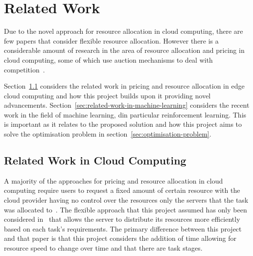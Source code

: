 \chapter{Related Work}\label{ch:background-literature}
Due to the novel approach for resource allocation in cloud computing, there are few papers that consider flexible
resource allocation. However there is a considerable amount of research in the area of resource allocation and
pricing in cloud computing, some of which use auction mechanisms to deal with
competition~\citep{KUMAR2017234,Zhang2017,Du2019,Bi2019}.

Section~\ref{sec:related-work-in-cloud-computing} considers the related work in pricing and resource allocation in
edge cloud computing and how this project builds upon it providing novel advancements.
Section~\ref{sec:related-work-in-machine-learning} considers the recent work in the field of machine learning,
din particular reinforcement learning. This is important as it relates to the proposed solution and how this
project aims to solve the optimisation problem in section~\ref{sec:optimisation-problem}.

\section{Related Work in Cloud Computing}\label{sec:related-work-in-cloud-computing} %
A majority of the approaches for pricing and resource allocation in cloud computing require users to request a
fixed amount of certain resource with the cloud provider having no control over the resources only the servers that the
task was allocated to~\citep{KUMAR2017234,Zhang2017,Du2019,Bi2019}. The flexible approach that this project
assumed has only been considered in~\cite{FlexibleResourceAllocation} that allows the server to distribute its resources
more efficiently based on each task's requirements. The primary difference between this project and that paper is that this
project considers the addition of time allowing for resource speed to change over time and that there are task stages.

